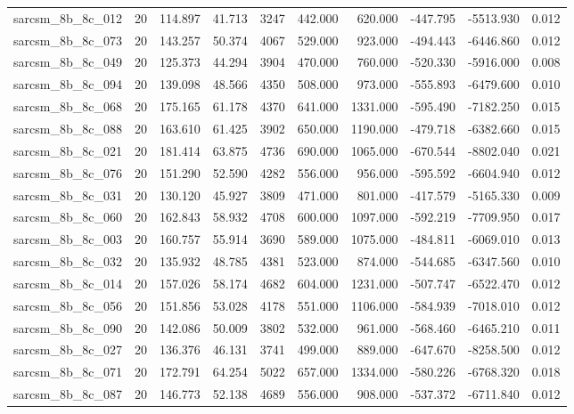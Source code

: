 \begin{tabular}{lrrrrrrrrr}
sarcsm\_8b\_8c\_012 & 20 & 114.897 & 41.713 & 3247 & 442.000 & 620.000 & -447.795 & -5513.930 & 0.012 \\
sarcsm\_8b\_8c\_073 & 20 & 143.257 & 50.374 & 4067 & 529.000 & 923.000 & -494.443 & -6446.860 & 0.012 \\
sarcsm\_8b\_8c\_049 & 20 & 125.373 & 44.294 & 3904 & 470.000 & 760.000 & -520.330 & -5916.000 & 0.008 \\
sarcsm\_8b\_8c\_094 & 20 & 139.098 & 48.566 & 4350 & 508.000 & 973.000 & -555.893 & -6479.600 & 0.010 \\
sarcsm\_8b\_8c\_068 & 20 & 175.165 & 61.178 & 4370 & 641.000 & 1331.000 & -595.490 & -7182.250 & 0.015 \\
sarcsm\_8b\_8c\_088 & 20 & 163.610 & 61.425 & 3902 & 650.000 & 1190.000 & -479.718 & -6382.660 & 0.015 \\
sarcsm\_8b\_8c\_021 & 20 & 181.414 & 63.875 & 4736 & 690.000 & 1065.000 & -670.544 & -8802.040 & 0.021 \\
sarcsm\_8b\_8c\_076 & 20 & 151.290 & 52.590 & 4282 & 556.000 & 956.000 & -595.592 & -6604.940 & 0.012 \\
sarcsm\_8b\_8c\_031 & 20 & 130.120 & 45.927 & 3809 & 471.000 & 801.000 & -417.579 & -5165.330 & 0.009 \\
sarcsm\_8b\_8c\_060 & 20 & 162.843 & 58.932 & 4708 & 600.000 & 1097.000 & -592.219 & -7709.950 & 0.017 \\
sarcsm\_8b\_8c\_003 & 20 & 160.757 & 55.914 & 3690 & 589.000 & 1075.000 & -484.811 & -6069.010 & 0.013 \\
sarcsm\_8b\_8c\_032 & 20 & 135.932 & 48.785 & 4381 & 523.000 & 874.000 & -544.685 & -6347.560 & 0.010 \\
sarcsm\_8b\_8c\_014 & 20 & 157.026 & 58.174 & 4682 & 604.000 & 1231.000 & -507.747 & -6522.470 & 0.012 \\
sarcsm\_8b\_8c\_056 & 20 & 151.856 & 53.028 & 4178 & 551.000 & 1106.000 & -584.939 & -7018.010 & 0.012 \\
sarcsm\_8b\_8c\_090 & 20 & 142.086 & 50.009 & 3802 & 532.000 & 961.000 & -568.460 & -6465.210 & 0.011 \\
sarcsm\_8b\_8c\_027 & 20 & 136.376 & 46.131 & 3741 & 499.000 & 889.000 & -647.670 & -8258.500 & 0.012 \\
sarcsm\_8b\_8c\_071 & 20 & 172.791 & 64.254 & 5022 & 657.000 & 1334.000 & -580.226 & -6768.320 & 0.018 \\
sarcsm\_8b\_8c\_087 & 20 & 146.773 & 52.138 & 4689 & 556.000 & 908.000 & -537.372 & -6711.840 & 0.012 \\

\end{tabular}
